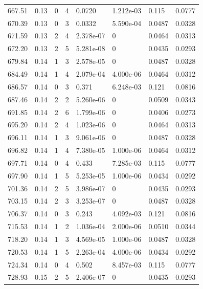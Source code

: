 \documentclass[preview]{standalone}
\begin{document}
{{{{{{{\begin{tabular}{L{1.2cm}C{1.2cm} C{0.3cm}C{0.5cm} C{1.4cm}C{1.4cm} C{1.4cm}C{1.4cm}}
  667.51  &  0.13  & 0     &  4 &  0.0720  & 1.212e-03  & 0.115 &  0.0777   \\ 
  670.39  &  0.13  & 0     &  3 &  0.0332  & 5.590e-04  & 0.0487 &  0.0328   \\ 
  671.59  &  0.13  & 2     &  4 &  2.378e-07  & 0  & 0.0464 &  0.0313   \\ 
  672.20  &  0.13  & 2     &  5 &  5.281e-08  & 0  & 0.0435 &  0.0293   \\ 
  679.84  &  0.14  & 1     &  3 &  2.578e-05  & 0  & 0.0487 &  0.0328   \\ 
  684.49  &  0.14  & 1     &  4 &  2.079e-04  & 4.000e-06  & 0.0464 &  0.0312   \\ 
  686.57  &  0.14  & 0     &  3 &  0.371  & 6.248e-03  & 0.121 &  0.0816   \\ 
  687.46  &  0.14  & 2     &  2 &  5.260e-06  & 0  & 0.0509 &  0.0343   \\ 
  691.85  &  0.14  & 2     &  6 &  1.799e-06  & 0  & 0.0406 &  0.0273   \\ 
  695.20  &  0.14  & 2     &  4 &  1.023e-06  & 0  & 0.0464 &  0.0313   \\ 
  696.11  &  0.14  & 1     &  3 &  9.061e-06  & 0  & 0.0487 &  0.0328   \\ 
  696.82  &  0.14  & 1     &  4 &  7.380e-05  & 1.000e-06  & 0.0464 &  0.0312   \\ 
  697.71  &  0.14  & 0     &  4 &  0.433  & 7.285e-03  & 0.115 &  0.0777   \\ 
  697.90  &  0.14  & 1     &  5 &  5.253e-05  & 1.000e-06  & 0.0434 &  0.0292   \\ 
  701.36  &  0.14  & 2     &  5 &  3.986e-07  & 0  & 0.0435 &  0.0293   \\ 
  703.15  &  0.14  & 2     &  3 &  3.253e-07  & 0  & 0.0487 &  0.0328   \\ 
  706.37  &  0.14  & 0     &  3 &  0.243  & 4.092e-03  & 0.121 &  0.0816   \\ 
  715.53  &  0.14  & 1     &  2 &  1.036e-04  & 2.000e-06  & 0.0510 &  0.0344   \\ 
  718.20  &  0.14  & 1     &  3 &  4.569e-05  & 1.000e-06  & 0.0487 &  0.0328   \\ 
  720.53  &  0.14  & 1     &  5 &  2.263e-04  & 4.000e-06  & 0.0434 &  0.0292   \\ 
  724.34  &  0.14  & 0     &  4 &  0.502  & 8.457e-03  & 0.115 &  0.0777   \\ 
  728.93  &  0.15  & 2     &  5 &  2.406e-07  & 0  & 0.0435 &  0.0293   \\ 

\end{tabular}}}}}}}}
\end{document}
